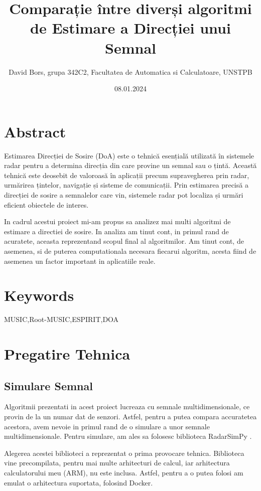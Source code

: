 \documentclass{article}
\title{Comparație între diverși algoritmi de Estimare a Direcției unui Semnal}
\author{David Bors, grupa 342C2, Facultatea de Automatica si Calculatoare, UNSTPB}
\date{08.01.2024}
\begin{document}
\maketitle

\section{Abstract}

Estimarea Direcției de Sosire (DoA) este o tehnică esențială utilizată în sistemele radar pentru a determina direcția din care provine un semnal sau o țintă. Această tehnică este deosebit de valoroasă în aplicații precum supravegherea prin radar, urmărirea țintelor, navigație și sisteme de comunicații. Prin estimarea precisă a direcției de sosire a semnalelor care vin, sistemele radar pot localiza și urmări eficient obiectele de interes.

In cadrul acestui proiect mi-am propus sa analizez mai multi algoritmi de estimare a directiei de sosire.
In analiza am tinut cont, in primul rand de acuratete, aceasta reprezentand scopul final al algoritmilor.
Am tinut cont, de asemenea, si de puterea computationala necesara fiecarui algoritm, acesta fiind de asemenea un factor important in aplicatiile reale.

\section{Keywords}
MUSIC,Root-MUSIC,ESPIRIT,DOA

\section{Pregatire Tehnica}

\subsection{Simulare Semnal}

Algoritmii prezentati in acest proiect lucreaza cu semnale multidimensionale, ce provin de la un numar dat de senzori.
Astfel, pentru a putea compara accuratetea acestora, avem nevoie in primul rand de o simulare a unor semnale multidimensionale.
Pentru simulare, am ales sa folosesc biblioteca RadarSimPy \cite{radarsim}.

Alegerea acestei biblioteci a reprezentat o prima provocare tehnica.
Biblioteca vine precompilata, pentru mai multe arhitecturi de calcul, iar arhitectura calculatorului meu (ARM), nu este inclusa.
Astfel, pentru a o putea folosi am emulat o arhitectura suportata, folosind Docker.
\end{document}
